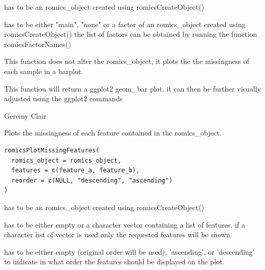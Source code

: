 \documentclass[a4paper]{book}
\begin{document}
%
\begin{Arguments}
\begin{ldescription}
\item[\code{romics\_object}] has to be an romics\_object created using romicsCreateObject()

\item[\code{main\_factor}] has to be either "main", "none" or a factor of an romics\_object created using romicsCreateObject() the list of factors can be obtained by running the function romicsFactorNames()
\end{ldescription}
\end{Arguments}
%
\begin{Details}
This function does not alter the romics\_object, it plots the the missingness of each sample in a barplot.
\end{Details}
%
\begin{Value}
This function will return a ggplot2 geom\_bar plot. it can then be further visually adjusted using the ggplot2 commands
\end{Value}
%
\begin{Author}
Geremy Clair
\end{Author}
%
\begin{Description}
Plots the missingness of each feature contained in the romics\_object.
\end{Description}
%
\begin{Usage}
\begin{verbatim}
romicsPlotMissingFeatures(
  romics_object = romics_object,
  features = c(feature_a, feature_b),
  reorder = c(NULL, "descending", "ascending")
)
\end{verbatim}
\end{Usage}
%
\begin{Arguments}
\begin{ldescription}
\item[\code{romics\_object}] has to be an romics\_object created using romicsCreateObject()

\item[\code{features}] has to be either empty or a character vector containing a list of features. if a character list of vector is used only the requested features will be shown.

\item[\code{reorder}] has to be either empty (original order will be used), 'ascending', or 'descending' to indicate in what order the features should be displayed on the plot.
\end{ldescription}
\end{Arguments}
\end{document}
